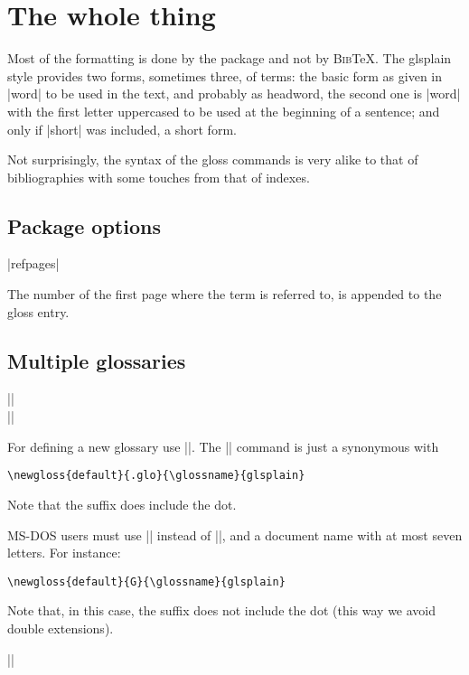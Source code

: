 \documentclass{ltxguide}
\newcommand{\gloss}{\textsf{gloss}}
\newcommand{\bibTeX}{\textsc{Bib}\TeX}
\begin{document}
\section{The whole thing}

Most of the formatting is done by the package and not by \bibTeX. The 
\textsf{glsplain} style provides two forms, sometimes three, of 
terms: the basic form as given in |word| to be used in the text, 
and probably as headword, the second one is |word| with the first 
letter uppercased to be used at the beginning of a sentence; and only 
if |short| was included, a short form.

Not surprisingly, the syntax of the \gloss{} commands is very
alike to that of bibliographies with some touches from that
of indexes.

\subsection{Package options}

\begin{decl}
|refpages|
\end{decl}

The number of the first page where the term is referred to, is
appended to the gloss entry.

\subsection{Multiple glossaries}

\begin{decl}
|\makegloss|\\
||
\end{decl}

For defining a new glossary use |\newgloss|. The |\makegloss|
command is just a synonymous with
\begin{verbatim}
\newgloss{default}{.glo}{\glossname}{glsplain}
\end{verbatim}
Note that the suffix does include the dot.

MS-DOS users must use |\newgloss| instead of |\makegloss|, and
a document name with at most seven letters. For instance:
\begin{verbatim}
\newgloss{default}{G}{\glossname}{glsplain}
\end{verbatim}
Note that, in this case, the suffix does not include the dot
(this way we avoid double extensions).

\begin{decl}
||
\end{decl}
\end{document}
